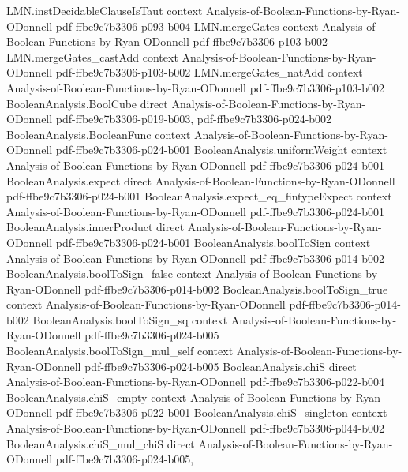 \begin{lemma}
  {LMN.instDecidableClauseIsTaut}
  {context}
  {Analysis-of-Boolean-Functions-by-Ryan-ODonnell}
  {pdf-ffbe9c7b3306-p093-b004}
\proofstep
  {LMN.mergeGates}
  {context}
  {Analysis-of-Boolean-Functions-by-Ryan-ODonnell}
  {pdf-ffbe9c7b3306-p103-b002}
\proofstep
  {LMN.mergeGates_castAdd}
  {context}
  {Analysis-of-Boolean-Functions-by-Ryan-ODonnell}
  {pdf-ffbe9c7b3306-p103-b002}
\proofstep
  {LMN.mergeGates_natAdd}
  {context}
  {Analysis-of-Boolean-Functions-by-Ryan-ODonnell}
  {pdf-ffbe9c7b3306-p103-b002}
\proofstep
  {BooleanAnalysis.BoolCube}
  {direct}
  {Analysis-of-Boolean-Functions-by-Ryan-ODonnell}
  {pdf-ffbe9c7b3306-p019-b003,
    pdf-ffbe9c7b3306-p024-b002}
\proofstep
  {BooleanAnalysis.BooleanFunc}
  {context}
  {Analysis-of-Boolean-Functions-by-Ryan-ODonnell}
  {pdf-ffbe9c7b3306-p024-b001}
\proofstep
  {BooleanAnalysis.uniformWeight}
  {context}
  {Analysis-of-Boolean-Functions-by-Ryan-ODonnell}
  {pdf-ffbe9c7b3306-p024-b001}
\proofstep
  {BooleanAnalysis.expect}
  {direct}
  {Analysis-of-Boolean-Functions-by-Ryan-ODonnell}
  {pdf-ffbe9c7b3306-p024-b001}
\proofstep
  {BooleanAnalysis.expect_eq_fintypeExpect}
  {context}
  {Analysis-of-Boolean-Functions-by-Ryan-ODonnell}
  {pdf-ffbe9c7b3306-p024-b001}
\proofstep
  {BooleanAnalysis.innerProduct}
  {direct}
  {Analysis-of-Boolean-Functions-by-Ryan-ODonnell}
  {pdf-ffbe9c7b3306-p024-b001}
\proofstep
  {BooleanAnalysis.boolToSign}
  {context}
  {Analysis-of-Boolean-Functions-by-Ryan-ODonnell}
  {pdf-ffbe9c7b3306-p014-b002}
\proofstep
  {BooleanAnalysis.boolToSign_false}
  {context}
  {Analysis-of-Boolean-Functions-by-Ryan-ODonnell}
  {pdf-ffbe9c7b3306-p014-b002}
\proofstep
  {BooleanAnalysis.boolToSign_true}
  {context}
  {Analysis-of-Boolean-Functions-by-Ryan-ODonnell}
  {pdf-ffbe9c7b3306-p014-b002}
\proofstep
  {BooleanAnalysis.boolToSign_sq}
  {context}
  {Analysis-of-Boolean-Functions-by-Ryan-ODonnell}
  {pdf-ffbe9c7b3306-p024-b005}
\proofstep
  {BooleanAnalysis.boolToSign_mul_self}
  {context}
  {Analysis-of-Boolean-Functions-by-Ryan-ODonnell}
  {pdf-ffbe9c7b3306-p024-b005}
\proofstep
  {BooleanAnalysis.chiS}
  {direct}
  {Analysis-of-Boolean-Functions-by-Ryan-ODonnell}
  {pdf-ffbe9c7b3306-p022-b004}
\proofstep
  {BooleanAnalysis.chiS_empty}
  {context}
  {Analysis-of-Boolean-Functions-by-Ryan-ODonnell}
  {pdf-ffbe9c7b3306-p022-b001}
\proofstep
  {BooleanAnalysis.chiS_singleton}
  {context}
  {Analysis-of-Boolean-Functions-by-Ryan-ODonnell}
  {pdf-ffbe9c7b3306-p044-b002}
\proofstep
  {BooleanAnalysis.chiS_mul_chiS}
  {direct}
  {Analysis-of-Boolean-Functions-by-Ryan-ODonnell}
  {pdf-ffbe9c7b3306-p024-b005,
}
\end{lemma}
